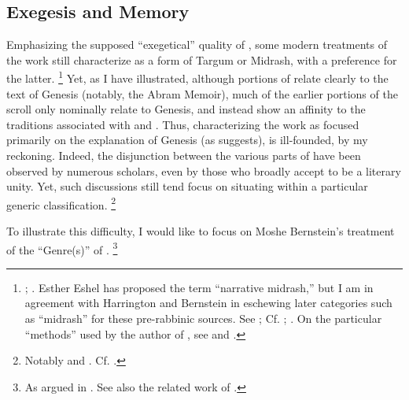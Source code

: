\subsection{Exegesis and Memory}
Emphasizing the supposed ``exegetical'' quality of \ga, some modern treatments of the work still characterize \ga as a form of Targum or Midrash, with a preference for the latter.%
    \footnote{\Cite{evans_revq1988}; \cite[19]{fitzmyer2004}. Esther Eshel has proposed the term ``narrative midrash,'' but I am in agreement with Harrington and Bernstein in eschewing later categories such as ``midrash'' for these pre-rabbinic sources. See \cite[182]{eshel_roitman-etal2011}; Cf. \cite[242]{harrington_kraft-nickelsburg1986}; \cite[327 n. 33; 328--329]{bernstein_berthelot-etal2010}. On the particular ``methods'' used by the author of \ga, see \cite{bernstein_dsd1996} and \cite{bernstein_henze2012}.}
Yet, as I have illustrated, although portions of \ga relate clearly to the text of Genesis (notably, the Abram Memoir), much of the earlier portions of the scroll only nominally relate to Genesis, and instead show an affinity to the traditions associated with \firstenoch and \jub. Thus, characterizing the work as focused primarily on the explanation of Genesis (as \vermes suggests), is ill-founded, by my reckoning. Indeed, the disjunction between the various parts of \ga have been observed by numerous scholars, even by those who broadly accept \ga to be a literary unity. Yet, such discussions still tend focus on situating \ga within a particular generic classification.%
    \footnote{Notably \cite{bernstein_as2010} and \cite{falk2007}. Cf. \cite{eshel_roitman-etal2011}.}

To illustrate this difficulty, I would like to focus on Moshe Bernstein's treatment of the ``Genre(s)'' of \ga.%
    \footnote{%
        As argued in \cite{bernstein_berthelot-etal2010}. See also the related work of \cite{bernasconi_as2011}.}
    
